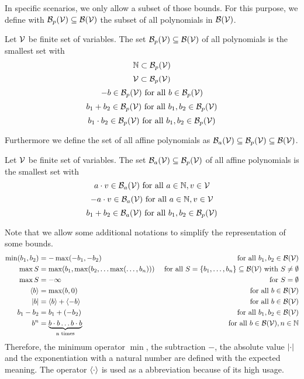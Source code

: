In specific scenarios, we only allow a subset of those bounds.
For this purpose, we define with $\mathcal{B}_p(\mathcal{V}) \subseteq \mathcal{B}(\mathcal{V})$ the subset of all polynomials in $\mathcal{B}(\mathcal{V})$.
\begin{definition}
  Let $\mathcal{V}$ be finite set of variables.
  The set $\mathcal{B}_p(\mathcal{V}) \subseteq \mathcal{B}(\mathcal{V})$ of all polynomials is the smallest set with
  \[ \mathbb{N} \subset \mathcal{B}_p(\mathcal{V}) \] 
  \[ \mathcal{V} \subset \mathcal{B}_p(\mathcal{V}) \] 
  \[ -b \in \mathcal{B}_p(\mathcal{V}) \text{ for all } b \in \mathcal{B}_p(\mathcal{V}) \] 
  \[ b_1 + b_2 \in \mathcal{B}_p(\mathcal{V}) \text{ for all } b_1, b_2 \in \mathcal{B}_p(\mathcal{V}) \] 
  \[ b_1 \cdot b_2 \in \mathcal{B}_p(\mathcal{V}) \text{ for all } b_1, b_2 \in \mathcal{B}_p(\mathcal{V}) \] 
\end{definition}
Furthermore we define the set of all affine polynomials as $\mathcal{B}_a(\mathcal{V}) \subseteq \mathcal{B}_p(\mathcal{V}) \subseteq \mathcal{B}(\mathcal{V})$. 
\begin{definition}
  Let $\mathcal{V}$ be finite set of variables.
  The set $\mathcal{B}_a(\mathcal{V}) \subseteq \mathcal{B}_p(\mathcal{V})$ of all affine polynomials is the smallest set with
  \[ a \cdot v \in \mathcal{B}_a(\mathcal{V}) \text{ for all } a \in \mathbb{N}, v \in \mathcal{V} \] 
  \[ -a \cdot v \in \mathcal{B}_a(\mathcal{V}) \text{ for all } a \in \mathbb{N}, v \in \mathcal{V} \] 
  \[ b_1 + b_2 \in \mathcal{B}_a(\mathcal{V}) \text{ for all } b_1, b_2 \in \mathcal{B}_p(\mathcal{V}) \] 
\end{definition}
Note that we allow some additional notations to simplify the representation of some bounds.
\begin{align*}
  \min(b_1,b_2) &= -\max(-b_1,-b_2) & \text{ for all } b_1, b_2 \in \mathcal{B}(\mathcal{V}) \\
  \max S &= \max(b_1, \max(b_2, \dots \max(\dots, b_n))) & \text{ for all } S = \lbrace b_1, \dots, b_n \rbrace \subseteq \mathcal{B}(\mathcal{V}) \text{ with } S \neq \emptyset \\
  \max S &= -\infty & \text{ for } S = \emptyset \\
  \langle b\rangle &= \max(b,0) & \text{ for all } b \in \mathcal{B}(\mathcal{V}) \\
  \left|b\right| &= \langle b\rangle + \langle-b\rangle & \text{ for all } b \in \mathcal{B}(\mathcal{V}) \\
  b_1 - b_2 &= b_1 + (-b_2) & \text{ for all } b_1, b_2 \in \mathcal{B}(\mathcal{V}) \\
  b^n &= \underbrace{b \cdot b \dots b \cdot b}_\text{n times} & \text{ for all } b \in \mathcal{B}(\mathcal{V}), n \in \mathbb{N}
\end{align*}
Therefore, the minimum operator $\min$, the subtraction $-$, the absolute value $\left|\cdot\right|$ and the exponentiation with a natural number are defined with the expected meaning.
The operator $\langle\cdot\rangle$ is used as a abbreviation because of its high usage.

